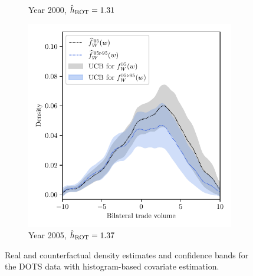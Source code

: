 \begin{figure}[ht]
\begin{subfigure}{0.32\textwidth}
    \caption{Year 2000, $\hat h_{\operatorname{ROT}} = 1.31$}
  \end{subfigure}
  \begin{subfigure}{0.32\textwidth}
    \centering
    \includegraphics[scale=0.48]{graphics/trade_plot_1995_2005.pdf}
    \caption{Year 2005, $\hat h_{\operatorname{ROT}} = 1.37$}
  \end{subfigure}
  \caption{Real and counterfactual density estimates
    and confidence bands for the DOTS data with histogram-based
  covariate estimation.}
  \label{fig:app_trade}
\end{figure}

